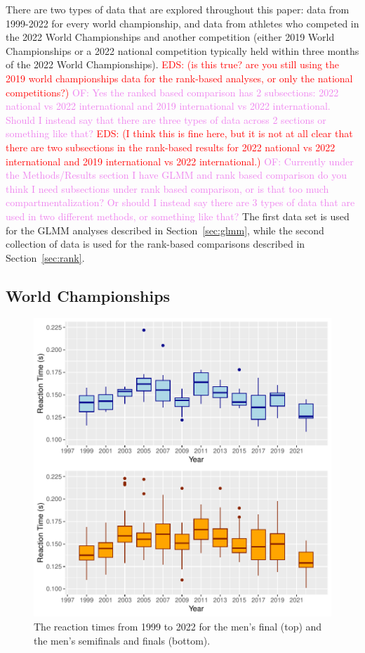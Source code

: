 \documentclass[12pt, letterpaper, titlepage]{article}
\newcommand{\eds}[1]{\textcolor{red}{EDS: (#1)}}
\newcommand{\of}[1]{\textcolor{violet}{OF: #1}}
\begin{document}
There are two types of data that are explored throughout this paper: data from
1999-2022 for every world championship, and data from athletes who competed in
the 2022 World Championships and another competition (either 2019 World 
Championships or a 2022 national competition typically held within three months 
of the 2022 World Championships). 
\eds{is this true? are you still using the 2019 world championships data for the
rank-based analyses, or only the national competitions?}
\of{Yes the ranked based comparison has 2 subsections: 2022 national vs 2022
international and 2019 international vs 2022 international.  Should I instead say
that there are three types of data across 2 sections or something like that?}
\eds{I think this is fine here, but it is not at all clear that there are two
subsections in the rank-based results for 2022 national vs 2022
international and 2019 international vs 2022 international.}
\of{Currently under the Methods/Results section I have GLMM and rank based comparison
do you think I need subsections under rank based comparison, or is that too much
compartmentalization?  Or should I instead say there are 3 types of data that are
used in two different methods, or something like that?}
The first data set is used for the GLMM analyses described in 
Section~\ref{sec:glmm}, while the second collection of data is used for the 
rank-based comparisons described in Section~\ref{sec:rank}.

\subsection{World Championships}\label{sec:dataworld}


\begin{figure}[tbp]
  \centering
  \includegraphics{Finals_Pooled_Boxplot}
  \caption{The reaction times from 1999 to 2022 for the men's final (top) and
  the men's semifinals and finals (bottom).}
  \label{fig:Boxplots}
\end{figure}
\end{document}
